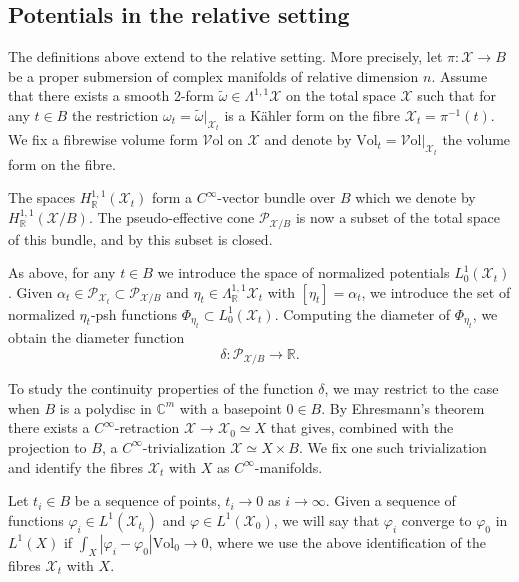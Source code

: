 \documentclass[11pt]{article}
\newcommand{\6}{\partial}
\newcommand{\bbR}{\mathbb{R}}
\newcommand{\bbC}{\mathbb{C}}
\newcommand{\PP}{\mathcal{P}}
\newcommand{\XX}{\mathcal{X}}
\newcommand{\Vol}{\mathrm{Vol}}
\newcommand{\VVol}{\mathcal{V}\mathrm{ol}}
\begin{document}
\subsection{Potentials in the relative setting}\label{sec_pot_rel}

The definitions above extend to the relative setting.
More precisely, let $\pi\colon \XX\to B$
be a proper submersion of complex manifolds of relative dimension $n$.
Assume that there exists a smooth 2-form $\tilde{\omega}\in\Lambda^{1,1}{\XX}$
on the total space $\XX$ such that for any $t\in B$ the restriction $\omega_t = \tilde{\omega}|_{\XX_t}$
is a K\"ahler form on the fibre $\XX_t = \pi^{-1}(t)$. We fix a fibrewise volume
form $\VVol$ on $\XX$ and denote by %
$\Vol_t = \VVol|_{\XX_t}$ the volume form on the fibre.

The spaces $H^{1,1}_\bbR(\XX_t)$ form a $C^\infty$-vector bundle over $B$
which we denote by $H^{1,1}_\bbR(\XX/B)$. The pseudo-effective cone $\PP_{\XX/B}$ is now
a subset of the total space of this bundle, and by \cite[Theorem A.1]{AHD} this
subset is closed.

As above, for any $t\in B$ we introduce the space of normalized
potentials $L^1_0(\XX_t)$. Given $\alpha_t\in \PP_{\XX_t} \subset \PP_{\XX/B}$
and $\eta_t \in \Lambda^{1,1}_{\bbR}\XX_t$ with $[\eta_t]=\alpha_t$, we
introduce the set of normalized $\eta_t$-psh functions $\Phi_{\eta_t}\subset L^1_0(\XX_t)$. Computing
the diameter of $\Phi_{\eta_t}$, we obtain the diameter function
$$\delta\colon \PP_{\XX/B}\to \bbR.$$

To study the continuity properties of the function $\delta$, we may
restrict to the case when $B$ is a polydisc in $\bbC^m$ with a basepoint $0\in B$.
By Ehresmann's theorem there exists a $C^\infty$-retraction $\XX\to\XX_0\simeq X$
that gives, combined with the projection to $B$, a $C^\infty$-trivialization $\XX\simeq X\times B$. We fix one such
trivialization and identify the fibres $\XX_t$ with $X$ as $C^\infty$-manifolds.

Let $t_i\in B$ be a sequence of points, $t_i\to 0$ as $i\to \infty$. Given
a sequence of functions $\varphi_i\in L^1(\XX_{t_i})$ and $\varphi\in L^1(\XX_0)$,
we will say that $\varphi_i$ converge to $\varphi_0$ in $L^1(X)$ if
$\int_X|\varphi_i - \varphi_0|\Vol_0 \to 0$, where we use the above identification of
the fibres $\XX_t$ with $X$.
\end{document}
